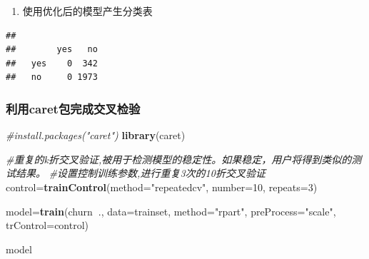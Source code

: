 \documentclass[
]{article}
\newenvironment{Shaded}{\begin{snugshade}}{\end{snugshade}}
\newcommand{\CommentTok}[1]{\textcolor[rgb]{0.56,0.35,0.01}{\textit{#1}}}
\newcommand{\DataTypeTok}[1]{\textcolor[rgb]{0.13,0.29,0.53}{#1}}
\newcommand{\DecValTok}[1]{\textcolor[rgb]{0.00,0.00,0.81}{#1}}
\newcommand{\KeywordTok}[1]{\textcolor[rgb]{0.13,0.29,0.53}{\textbf{#1}}}
\newcommand{\NormalTok}[1]{#1}
\newcommand{\OperatorTok}[1]{\textcolor[rgb]{0.81,0.36,0.00}{\textbf{#1}}}
\newcommand{\StringTok}[1]{\textcolor[rgb]{0.31,0.60,0.02}{#1}}
\providecommand{\tightlist}{%
  \setlength{\itemsep}{0pt}\setlength{\parskip}{0pt}}
\begin{document}
\begin{enumerate}
\def\labelenumi{\arabic{enumi}.}
\setcounter{enumi}{3}
\tightlist
\item
  使用优化后的模型产生分类表
\end{enumerate}

\begin{Shaded}
\end{Shaded}

\begin{verbatim}
##      
##        yes   no
##   yes    0  342
##   no     0 1973
\end{verbatim}

\hypertarget{ux5229ux7528caretux5305ux5b8cux6210ux4ea4ux53c9ux68c0ux9a8c}{%
\subsubsection{利用caret包完成交叉检验}\label{ux5229ux7528caretux5305ux5b8cux6210ux4ea4ux53c9ux68c0ux9a8c}}

\begin{Shaded}
\begin{Highlighting}[]
\CommentTok{#install.packages("caret")}
\KeywordTok{library}\NormalTok{(caret)}

\CommentTok{#重复的k折交叉验证,被用于检测模型的稳定性。如果稳定，用户将得到类似的测试结果。}
\CommentTok{#设置控制训练参数,进行重复3次的10折交叉验证}
\NormalTok{control=}\KeywordTok{trainControl}\NormalTok{(}\DataTypeTok{method=}\StringTok{"repeatedcv"}\NormalTok{,}
                     \DataTypeTok{number=}\DecValTok{10}\NormalTok{,}
                     \DataTypeTok{repeats=}\DecValTok{3}\NormalTok{)}


\NormalTok{model=}\KeywordTok{train}\NormalTok{(churn}\OperatorTok{~}\NormalTok{.,}
            \DataTypeTok{data=}\NormalTok{trainset,}
            \DataTypeTok{method=}\StringTok{"rpart"}\NormalTok{,}
            \DataTypeTok{preProcess=}\StringTok{"scale"}\NormalTok{,}
            \DataTypeTok{trControl=}\NormalTok{control)}

\NormalTok{model}
\end{Highlighting}
\end{Shaded}
\end{document}
